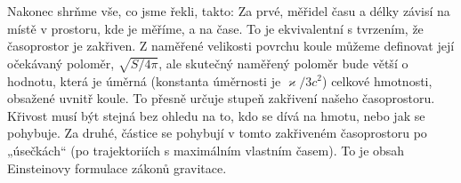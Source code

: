 {    Nakonec shrňme vše, co jsme řekli, takto: Za prvé, měřidel času a délky závisí na místě v 
    prostoru, kde je měříme, a na čase. To je ekvivalentní s tvrzením, že časoprostor je zakřiven. 
    Z naměřené velikosti povrchu koule můžeme definovat její očekávaný poloměr, \(\sqrt{S/4\pi}\), 
    ale skutečný naměřený poloměr bude větší o hodnotu, která je úměrná (konstanta úměrnosti je 
    \(\varkappa/3c^2\)) celkové hmotnosti, obsažené uvnitř koule. To přesně určuje stupeň zakřivení 
    našeho časoprostoru. Křivost musí být stejná bez ohledu na to, kdo se dívá na hmotu, nebo jak 
    se pohybuje. Za druhé, částice se pohybují v tomto zakřiveném časoprostoru po „úsečkách“ (po 
    trajektoriích s maximálním vlastním časem). To je obsah Einsteinovy formulace zákonů gravitace.

} %
\printbibliography[title={Seznam literatury}, heading=subbibliography]
